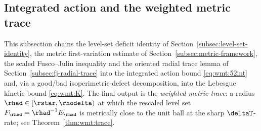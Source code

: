 %
%

\subsection{Integrated action and the weighted metric trace}\label{subsec:weighted-metric-trace}

This subsection chains the level-set deficit identity of
Section~\ref{subsec:level-set-identity}, the metric first-variation
estimate of Section~\ref{subsec:metric-framework}, the scaled
Fusco--Julin inequality and the oriented radial trace lemma of
Section~\ref{subsec:fj-radial-trace} into the integrated action bound
\eqref{eq:wmt:52int} and, via a good/bad isoperimetric-defect
decomposition, into the Lebesgue kinetic bound \eqref{eq:wmt:K}. The
final output is the \emph{weighted metric trace}: a radius
$\rhad\in[\rstar,\rhodelta)$ at which the rescaled level set
$F_\rhad=\rhad^{-1}E_\rhad$ is metrically close to the unit ball at the
sharp $\deltaT$-rate; see Theorem~\ref{thm:wmt:trace}.

